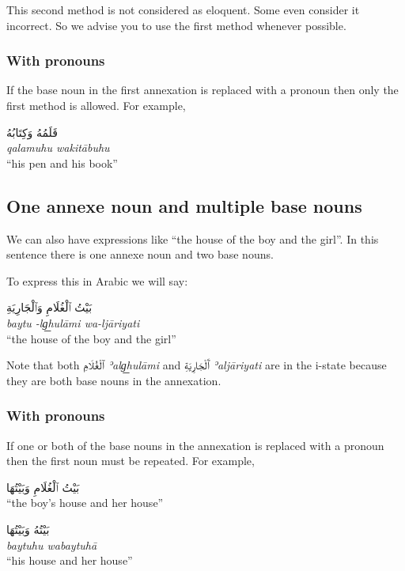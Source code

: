 \documentclass[
  10pt,
]{book}
\begin{document}
This second method is not considered as eloquent. Some even consider it incorrect. So we advise you to use the first method whenever possible.

\subsubsection{With pronouns}\label{with-pronouns}

If the base noun in the first annexation is replaced with a pronoun then only the first method is allowed. For example,

\foreignlanguage{arabic}{قَلَمُهُ وَکِتَابُهُ}\\
\emph{qalamuhu wakitābuhu}\\
\enquote{his pen and his book}

\subsection{One annexe noun and multiple base nouns}\label{one-annexe-noun-and-multiple-base-nouns}

We can also have expressions like \enquote{the house of the boy and the girl}. In this sentence there is one annexe noun and two base nouns.

To express this in Arabic we will say:

\foreignlanguage{arabic}{بَيْتُ ٱلْغُلَامِ وَٱلْجَارِيَةِ}\\
\emph{baytu -lg͟hulāmi wa-ljāriyati}\\
\enquote{the house of the boy and the girl}

Note that both
\foreignlanguage{arabic}{ٱلْغُلَامِ} \emph{ʾalg͟hulāmi} and \foreignlanguage{arabic}{ٱَلْجَارِيَةِ} \emph{ʾaljāriyati} are in the i-state because they are both base nouns in the annexation.

\subsubsection{With pronouns}\label{with-pronouns-1}

If one or both of the base nouns in the annexation is replaced with a pronoun then the first noun must be repeated. For example,

\foreignlanguage{arabic}{بَيْتُ ٱلْغُلَامِ وَبَيْتُهَا}\\
\enquote{the boy's house and her house}

\foreignlanguage{arabic}{بَيْتُهُ وَبَيْتُهَا}\\
\emph{baytuhu wabaytuhā}\\
\enquote{his house and her house}
\end{document}

